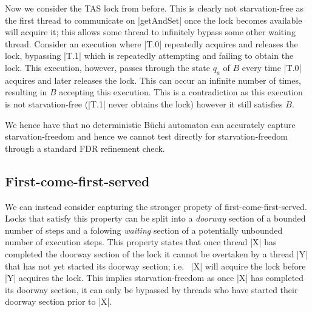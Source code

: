 
Now we consider the TAS lock from before. This is clearly not starvation-free as the first thread to communicate on |getAndSet| once the lock becomes available will acquire it; this allows some thread to infinitely bypass some other waiting thread. Consider an execution where |T.0| repeatedly acquires and releases the lock, bypassing |T.1| which is repeatedly attempting and failing to obtain the lock. This execution, however, passes through the state $q_{a}$ of $B$ every time |T.0| acquires and later releases the lock. This can occur an infinite number of times, resulting in $B$ accepting this execution. This is a contradiction as this execution is not starvation-free (|T.1| never obtains the lock) however it still satisfies $B$.



We hence have that no deterministic B{\"u}chi automaton can accurately capture starvation-freedom and hence we cannot test directly for starvation-freedom through a standard FDR refinement check.

\subsection{First-come-first-served}

We can instead consider capturing the stronger propety of first-come-first-served. Locks that satisfy this property can be split into a \emph{doorway} section of a bounded number of steps and a folowing \emph{waiting} section of a potentially unbounded number of execution steps. This property states that once thread |X| has completed the doorway section of the lock it cannot be overtaken by a thread |Y| that has not yet started its doorway section; i.e.~ |X| will acquire the lock before |Y| acquires the lock. This implies starvation-freedom as once |X| has completed its doorway section, it can only be bypassed by threads who have started their doorway section prior to |X|.

